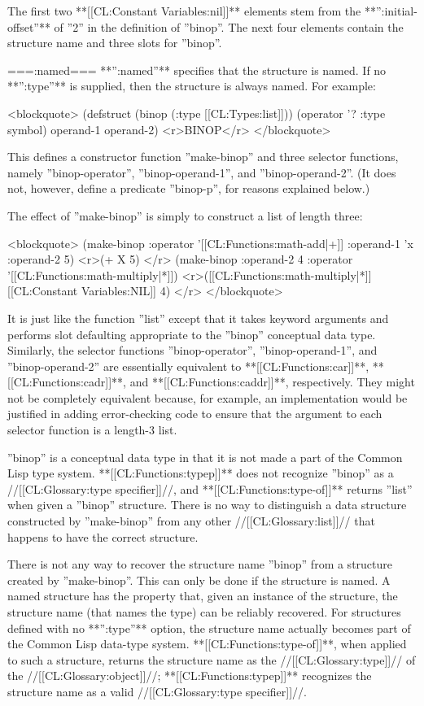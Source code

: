 The first two **[[CL:Constant Variables:nil]]** elements stem from the **'':initial-offset''** of ''2'' in the definition of ''binop''. The next four elements contain the structure name and three slots for ''binop''.

===:named===
**'':named''** specifies that the structure is named. If no **'':type''** is supplied, then the structure is always named. For example:

<blockquote> 
(defstruct (binop (:type [[CL:Types:list]])) 
  (operator '? :type symbol) 
  operand-1 
  operand-2) <r>BINOP</r>
</blockquote> 

This defines a constructor function ''make-binop'' and three selector functions, namely ''binop-operator'', ''binop-operand-1'', and ''binop-operand-2''. (It does not, however, define a predicate ''binop-p'', for reasons explained below.)

The effect of ''make-binop'' is simply to construct a list of length three:

<blockquote> 
(make-binop :operator '[[CL:Functions:math-add|+]] 
            :operand-1 'x 
            :operand-2 5) <r>(+ X 5) </r>
(make-binop :operand-2 4 
            :operator '[[CL:Functions:math-multiply|*]]) 
<r>([[CL:Functions:math-multiply|*]] [[CL:Constant Variables:NIL]] 4) </r>
</blockquote> 

It is just like the function ''list'' except that it takes keyword arguments and performs slot defaulting appropriate to the ''binop'' conceptual data type. Similarly, the selector functions ''binop-operator'', ''binop-operand-1'', and ''binop-operand-2'' are essentially equivalent to **[[CL:Functions:car]]**, **[[CL:Functions:cadr]]**, and **[[CL:Functions:caddr]]**, respectively. They might not be completely equivalent because, for example, an implementation would be justified in adding error-checking code to ensure that the argument to each selector function is a length-3 list.

''binop'' is a conceptual data type in that it is not made a part of the Common Lisp type system. **[[CL:Functions:typep]]** does not recognize ''binop'' as a //[[CL:Glossary:type specifier]]//, and **[[CL:Functions:type-of]]** returns ''list'' when given a ''binop'' structure. There is no way to distinguish a data structure constructed by ''make-binop'' from any other //[[CL:Glossary:list]]// that happens to have the correct structure.

There is not any way to recover the structure name ''binop'' from a structure created by ''make-binop''. This can only be done if the structure is named. A named structure has the property that, given an instance of the structure, the structure name (that names the type) can be reliably recovered. For structures defined with no **'':type''** option, the structure name actually becomes part of the Common Lisp data-type system. **[[CL:Functions:type-of]]**, when applied to such a structure, returns the structure name as the //[[CL:Glossary:type]]// of the //[[CL:Glossary:object]]//; **[[CL:Functions:typep]]** recognizes the structure name as a valid //[[CL:Glossary:type specifier]]//.

